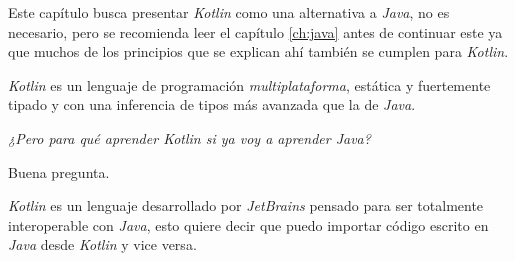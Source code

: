 Este capítulo busca presentar \textit{Kotlin} como una alternativa a \textit{Java}, no es
necesario, pero se recomienda leer el capítulo \ref{ch:java} antes de continuar este ya que
muchos de los principios que se explican ahí también se cumplen para \textit{Kotlin}.

\textit{Kotlin} es un lenguaje de programación \textit{multiplataforma}, estática y fuertemente
tipado y con una inferencia de tipos más avanzada que la de \textit{Java}.

\begin{center}
\textit{¿Pero para qué aprender Kotlin si ya voy a aprender Java?}
\end{center}

Buena pregunta.
\vfill

\textit{Kotlin} es un lenguaje desarrollado por \textit{JetBrains} pensado para ser totalmente 
interoperable con \textit{Java}, esto quiere decir que puedo importar código escrito en 
\textit{Java} desde \textit{Kotlin} y vice versa.